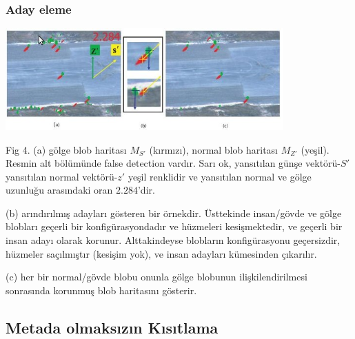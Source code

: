 \documentclass{beamer}
\begin{document}
\begin{frame}[allowframebreaks]
	\frametitle{Aday eleme}

	\includegraphics[width=0.8\textwidth]{img/fig4.jpg}\label{fig:aday-eleme}

	\begin{scriptsize}
	Fig 4. (a) gölge blob haritası $M_{S'}$ (kırmızı), normal blob haritası
	$M_{Z'}$ (yeşil). Resmin alt bölümünde false detection vardır. Sarı ok,
	yansıtılan günşe vektörü-$S'$ yansıtılan normal vektörü-$z'$ yeşil
	renklidir ve yansıtılan normal ve gölge uzunluğu arasındaki oran
	$2.284$'dir.

	(b) arındırılmış adayları gösteren bir örnekdir. Üsttekinde insan/gövde ve
	gölge blobları geçerli bir konfigürasyondadır ve hüzmeleri kesişmektedir, ve
	geçerli bir insan adayı olarak korunur. Alttakindeyse blobların
	konfigürasyonu geçersizdir, hüzmeler saçılmıştır (kesişim yok), ve insan
	adayları kümesinden çıkarılır.

	(c) her bir normal/gövde blobu onunla gölge blobunun ilişkilendirilmesi
	sonrasında korunmuş blob haritasını gösterir.

	\end{scriptsize}
\end{frame}

\subsection{Metada olmaksızın Kısıtlama}
\end{document}

